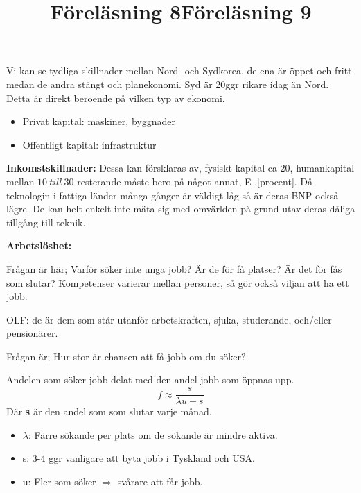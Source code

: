 \documentclass{article}
\begin{document}
\vspace{5mm}
\title{Föreläsning 8}
\vspace{5mm} \par \noindent 

Vi kan se tydliga skillnader mellan Nord- och Sydkorea, de ena är öppet och fritt medan de andra stängt och planekonomi. Syd är 20ggr rikare idag än Nord. Detta är direkt beroende på vilken typ av ekonomi. 

\begin{itemize}
    \item Privat kapital: maskiner, byggnader
    \item Offentligt kapital: infrastruktur
\end{itemize}

\textbf{Inkomstskillnader: } Dessa kan försklaras av, fysiskt kapital ca $ 20 $, humankapital mellan $ 10  \ till \ 30  $  resterande måste bero på något annat, E ,[procent].
Då teknologin i fattiga länder många gånger är väldigt låg så är deras BNP också lägre. De kan helt enkelt inte mäta sig med omvärlden på grund utav deras dåliga tillgång till teknik. 

\vspace{5mm}
\title{Föreläsning 9}
\vspace{5mm} \par \noindent 

\textbf{Arbetslöshet:} \par \noindent Frågan är här; Varför söker inte unga jobb? Är de för få platser? Är det för fås som slutar? Kompetenser varierar mellan personer, så gör också viljan att ha ett jobb.  \par \noindent  OLF: de är dem som står utanför arbetskraften, sjuka, studerande, och/eller pensionärer.  \par \noindent Frågan är; Hur stor är chansen att få jobb om du söker?  \par \noindent 
Andelen som söker jobb delat med den andel jobb som öppnas upp. 
$$
f \approx \frac{s}{\lambda u+s}
$$
Där \textbf{s} är den andel som som slutar varje månad.  \par \noindent 

\begin{itemize}
    \item $ \lambda$: Färre sökande per plats om de sökande är mindre aktiva.
    \item s: 3-4 ggr vanligare att byta jobb i Tyskland och USA.
    \item u: Fler som söker $ \Rightarrow $ svårare att får jobb. 
\end{itemize}
\end{document}
